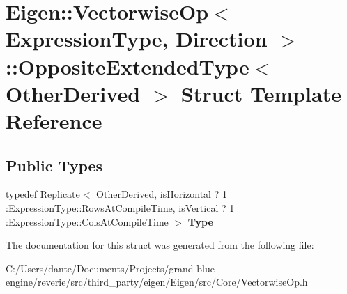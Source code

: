 \hypertarget{struct_eigen_1_1_vectorwise_op_1_1_opposite_extended_type}{}\section{Eigen\+::Vectorwise\+Op$<$ Expression\+Type, Direction $>$\+::Opposite\+Extended\+Type$<$ Other\+Derived $>$ Struct Template Reference}
\label{struct_eigen_1_1_vectorwise_op_1_1_opposite_extended_type}
\subsection*{Public Types}
\begin{DoxyCompactItemize}
\item 
\mbox{\label{struct_eigen_1_1_vectorwise_op_1_1_opposite_extended_type_a76d7744eef659dd1578fe35fc8e3692b}} 
typedef \mbox{\hyperlink{class_eigen_1_1_replicate}{Replicate}}$<$ Other\+Derived, is\+Horizontal ? 1 \+:Expression\+Type\+::\+Rows\+At\+Compile\+Time, is\+Vertical ? 1 \+:Expression\+Type\+::\+Cols\+At\+Compile\+Time $>$ {\bfseries Type}
\end{DoxyCompactItemize}


The documentation for this struct was generated from the following file\+:\begin{DoxyCompactItemize}
\item 
C\+:/\+Users/dante/\+Documents/\+Projects/grand-\/blue-\/engine/reverie/src/third\+\_\+party/eigen/\+Eigen/src/\+Core/Vectorwise\+Op.\+h\end{DoxyCompactItemize}
